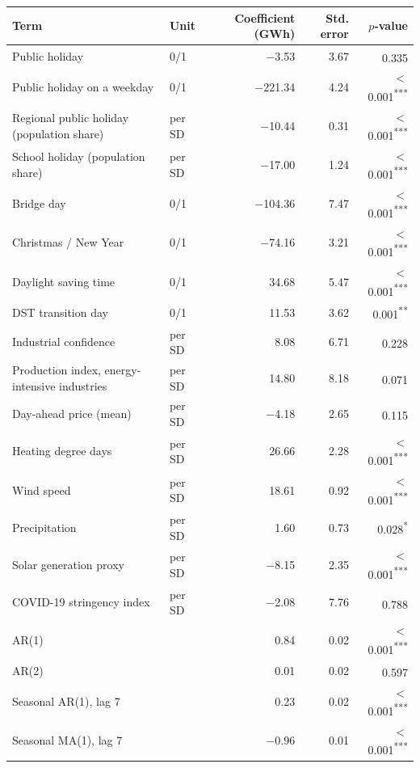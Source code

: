 \begin{tabular}{llrrr}
\toprule
Term & Unit & Coefficient (GWh) & Std. error & $p$-value \\
\midrule
Public holiday & 0/1 & $-$3.53 & 3.67 & 0.335\textsuperscript{\phantom{***}} \\
Public holiday on a weekday & 0/1 & $-$221.34 & 4.24 & $<$0.001\textsuperscript{***} \\
Regional public holiday (population share) & per SD & $-$10.44 & 0.31 & $<$0.001\textsuperscript{***} \\
School holiday (population share) & per SD & $-$17.00 & 1.24 & $<$0.001\textsuperscript{***} \\
Bridge day & 0/1 & $-$104.36 & 7.47 & $<$0.001\textsuperscript{***} \\
Christmas / New Year & 0/1 & $-$74.16 & 3.21 & $<$0.001\textsuperscript{***} \\
Daylight saving time & 0/1 & 34.68 & 5.47 & $<$0.001\textsuperscript{***} \\
DST transition day & 0/1 & 11.53 & 3.62 & 0.001\textsuperscript{**\phantom{*}} \\
Industrial confidence & per SD & 8.08 & 6.71 & 0.228\textsuperscript{\phantom{***}} \\
Production index, energy-intensive industries & per SD & 14.80 & 8.18 & 0.071\textsuperscript{\phantom{***}} \\
Day-ahead price (mean) & per SD & $-$4.18 & 2.65 & 0.115\textsuperscript{\phantom{***}} \\
Heating degree days & per SD & 26.66 & 2.28 & $<$0.001\textsuperscript{***} \\
Wind speed & per SD & 18.61 & 0.92 & $<$0.001\textsuperscript{***} \\
Precipitation & per SD & 1.60 & 0.73 & 0.028\textsuperscript{*\phantom{**}} \\
Solar generation proxy & per SD & $-$8.15 & 2.35 & $<$0.001\textsuperscript{***} \\
COVID-19 stringency index & per SD & $-$2.08 & 7.76 & 0.788\textsuperscript{\phantom{***}} \\
AR(1) &  & 0.84 & 0.02 & $<$0.001\textsuperscript{***} \\
AR(2) &  & 0.01 & 0.02 & 0.597\textsuperscript{\phantom{***}} \\
Seasonal AR(1), lag 7 &  & 0.23 & 0.02 & $<$0.001\textsuperscript{***} \\
Seasonal MA(1), lag 7 &  & $-$0.96 & 0.01 & $<$0.001\textsuperscript{***} \\
\bottomrule
\end{tabular}
